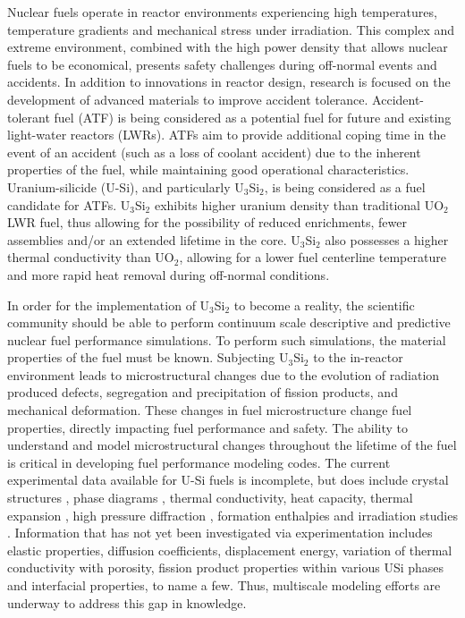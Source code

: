 \documentclass[review]{elsarticle}
\begin{document}
Nuclear fuels operate in reactor environments experiencing high temperatures, temperature gradients and mechanical stress under irradiation.  This complex and extreme environment, combined with the high power density that allows nuclear fuels to be economical, presents safety challenges during off-normal events and accidents.  In addition to innovations in reactor design, research is focused on the development of advanced materials \cite{zinkle2016} to improve accident tolerance.  Accident-tolerant fuel (ATF) \cite{zinkle2014} is being considered as a potential fuel for future and existing light-water reactors (LWRs).  ATFs aim to provide additional coping time in the event of an accident (such as a loss of coolant accident) due to the inherent properties of the fuel, while maintaining good operational characteristics.  Uranium-silicide (U-Si), and particularly U$_{3}$Si$_{2}$, is being considered as a fuel candidate for ATFs.  U$_{3}$Si$_{2}$ exhibits higher uranium density than traditional UO$_{2}$ LWR fuel, thus allowing for the possibility of reduced enrichments, fewer assemblies and/or an extended lifetime in the core.  U$_{3}$Si$_{2}$ also possesses a higher thermal conductivity than UO$_{2}$, allowing for a lower fuel centerline temperature and more rapid heat removal during off-normal conditions.  

In order for the implementation of U$_{3}$Si$_{2}$ to become a reality, the scientific community should be able to perform continuum scale descriptive and predictive nuclear fuel performance simulations.  To perform such simulations, the material properties of the fuel must be known.  Subjecting U$_{3}$Si$_{2}$ to the in-reactor environment leads to microstructural changes due to the evolution of radiation produced defects, segregation and precipitation of fission products, and mechanical deformation. These changes in fuel microstructure change fuel properties, directly impacting fuel performance and safety.  The ability to understand and model microstructural changes throughout the lifetime of the fuel is critical in developing fuel performance modeling codes.  The current experimental data available for U-Si fuels is incomplete, but does include crystal structures \cite{zachariasen1949, remschnig1992}, phase diagrams \cite{massalski1990}, thermal conductivity, heat capacity, thermal expansion \cite{white2015, shimizu1965}, high pressure diffraction \cite{yagoubi2013}, formation enthalpies \cite{gross1962, ohare1975, alcock1962, rand1963, berche2009} and irradiation studies \cite{shimizu1965, finlay2002}.  Information that has not yet been investigated via experimentation includes elastic properties, diffusion coefficients, displacement energy, variation of thermal conductivity with porosity, fission product properties within various USi phases and interfacial properties, to name a few.  Thus, multiscale modeling efforts are underway to address this gap in knowledge.
\end{document}
